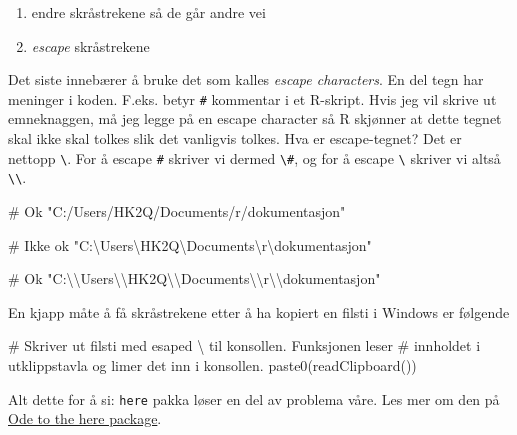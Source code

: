 \documentclass[
  letterpaper,
  DIV=11,
  numbers=noendperiod]{scrreprt}
\newenvironment{Shaded}{\begin{snugshade}}{\end{snugshade}}
\newcommand{\CommentTok}[1]{\textcolor[rgb]{0.37,0.37,0.37}{#1}}
\newcommand{\FunctionTok}[1]{\textcolor[rgb]{0.28,0.35,0.67}{#1}}
\newcommand{\NormalTok}[1]{\textcolor[rgb]{0.00,0.23,0.31}{#1}}
\newcommand{\SpecialCharTok}[1]{\textcolor[rgb]{0.37,0.37,0.37}{#1}}
\newcommand{\StringTok}[1]{\textcolor[rgb]{0.13,0.47,0.30}{#1}}
\providecommand{\tightlist}{%
  \setlength{\itemsep}{0pt}\setlength{\parskip}{0pt}}\usepackage{longtable,booktabs,array}
\begin{document}
\begin{enumerate}
\def\labelenumi{\arabic{enumi}.}
\tightlist
\item
  endre skråstrekene så de går andre vei
\item
  \emph{escape} skråstrekene
\end{enumerate}

Det siste innebærer å bruke det som kalles \emph{escape characters}. En
del tegn har meninger i koden. F.eks. betyr \texttt{\#} kommentar i et
R-skript. Hvis jeg vil skrive ut emneknaggen, må jeg legge på en escape
character så R skjønner at dette tegnet skal ikke skal tolkes slik det
vanligvis tolkes. Hva er escape-tegnet? Det er nettopp
\texttt{\textbackslash{}}. For å escape \texttt{\#} skriver vi dermed
\texttt{\textbackslash{}\#}, og for å escape \texttt{\textbackslash{}}
skriver vi altså \texttt{\textbackslash{}\textbackslash{}}.

\begin{Shaded}
\begin{Highlighting}[]
\CommentTok{\# Ok}
\StringTok{"C:/Users/HK2Q/Documents/r/dokumentasjon"}

\CommentTok{\# Ikke ok}
\StringTok{"C:\textbackslash{}Users\textbackslash{}HK2Q\textbackslash{}Documents}\SpecialCharTok{\textbackslash{}r}\StringTok{\textbackslash{}dokumentasjon"}

\CommentTok{\# Ok}
\StringTok{"C:}\SpecialCharTok{\textbackslash{}\textbackslash{}}\StringTok{Users}\SpecialCharTok{\textbackslash{}\textbackslash{}}\StringTok{HK2Q}\SpecialCharTok{\textbackslash{}\textbackslash{}}\StringTok{Documents}\SpecialCharTok{\textbackslash{}\textbackslash{}}\StringTok{r}\SpecialCharTok{\textbackslash{}\textbackslash{}}\StringTok{dokumentasjon"}
\end{Highlighting}
\end{Shaded}

En kjapp måte å få skråstrekene etter å ha kopiert en filsti i Windows
er følgende

\begin{Shaded}
\begin{Highlighting}[]
\CommentTok{\# Skriver ut filsti med esaped \textasciigrave{}\textbackslash{}\textasciigrave{} til konsollen. Funksjonen leser }
\CommentTok{\# innholdet i utklippstavla og limer det inn i konsollen.}
\FunctionTok{paste0}\NormalTok{(}\FunctionTok{readClipboard}\NormalTok{())}
\end{Highlighting}
\end{Shaded}

Alt dette for å si: \texttt{here} pakka løser en del av problema våre.
Les mer om den på \href{https://github.com/jennybc/here_here}{Ode to the
here package}.
\end{document}
